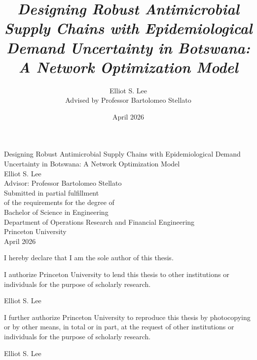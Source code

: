\documentclass{article}
\begin{document}
\begin{titlepage}
\thispagestyle{empty}
\null
\vfill
\begin{center}
{\sc \LARGE Designing Robust Antimicrobial Supply Chains with Epidemiological Demand Uncertainty in Botswana: A Network Optimization Model}\\
\vspace{.6in}
Elliot S. Lee\\
Advisor: Professor Bartolomeo Stellato\\
\vspace{.6in}
Submitted in partial fulfillment\\
of the requirements for the degree of\\
Bachelor of Science in Engineering\\
Department of Operations Research and Financial Engineering\\
Princeton University\\
\vspace{0.6in}
April 2026
\end{center}
\vfill
\end{titlepage}

\newpage
\thispagestyle{empty}
\vspace*{.2in}
\noindent I hereby declare that I am the sole author of this thesis.

\vspace{0.3in}
\noindent I authorize Princeton University to lend this thesis to other institutions or individuals for the purpose of scholarly research.

\vspace{0.8in}
\hspace*{3.5in}\makebox[2.0in]{\hrulefill}

\hspace*{3.5in}Elliot S. Lee

\vspace{0.8in}
\noindent I further authorize Princeton University to reproduce this thesis by photocopying or by other means, in total or in part, at the request of other institutions or individuals for the purpose of scholarly research.

\vspace{0.8in}
\hspace*{3.5in}\makebox[2.0in]{\hrulefill}

\hspace*{3.5in}Elliot S. Lee
\clearpage


\singlespacing
\title{\textit{Designing Robust Antimicrobial Supply
Chains with Epidemiological Demand
Uncertainty in Botswana: A Network
Optimization Model}}
\author{Elliot S. Lee \\ Advised by Professor Bartolomeo Stellato}
\date{April 2026}
\end{document}
